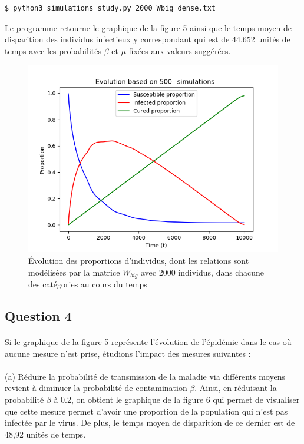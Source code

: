 \documentclass[a4paper, 12pt, oneside]{article}
\begin{document}
\begin{lstlisting}[language=bash]
$ python3 simulations_study.py 2000 Wbig_dense.txt 
\end{lstlisting}

\noindent Le programme retourne le graphique de la figure 5 ainsi que le temps moyen de disparition des individus infectieux y correspondant qui est de 44,652 unités de temps avec les probabilités $\beta$ et $\mu$ fixées aux valeurs suggérées.

\begin{figure}[H]
	\centering
	\includegraphics[scale=1]{Wbig_dense_simulations.png} 
	\caption{Évolution des proportions d'individus, dont les relations sont modélisées par la matrice $W_{big}$ avec 2000 individus, dans chacune des catégories au cours du temps}
\end{figure}

\subsection{Question 4}

\paragraph{}Si le graphique de la figure 5 représente l'évolution de l'épidémie dans le cas où aucune mesure n'est prise, étudions l'impact des mesures suivantes :

\paragraph{}(a) Réduire la probabilité de transmission de la maladie via différents moyens revient à diminuer la probabilité de contamination $\beta$. Ainsi, en réduisant la probabilité $\beta$ à 0.2, on obtient le graphique de la figure 6 qui permet de visualiser que cette mesure permet d'avoir une proportion de la population qui n'est pas infectée par le virus. De plus, le temps moyen de disparition de ce dernier est de 48,92 unités de temps.
\end{document}

